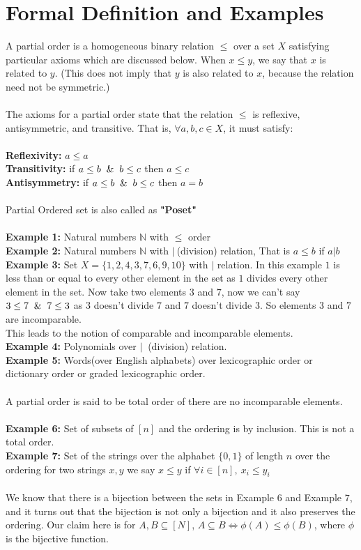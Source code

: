 \section{Formal Definition and Examples}
A partial order is a homogeneous binary relation $\leq$ over a set $X$ satisfying particular axioms which are discussed below. When $x\leq y$, we say that $x$ is related to $y$. (This does not imply that $y$ is also related to $x$, because the relation need not be symmetric.)\\\\
The axioms for a partial order state that the relation $\leq$ is reflexive, antisymmetric, and transitive. That is, $\forall a, b, c \in X$, it must satisfy:\\\\
\textbf{Reflexivity:} $a\leq a$\\
\textbf{Transitivity:} if $a\leq b \And b \leq c$ then $a \leq c$\\
\textbf{Antisymmetry:} if $a \leq b \And b \leq c$ then $a = b$\\\\
Partial Ordered set is also called as \textbf{"Poset"}\\\\
\textbf{Example 1:} Natural numbers $\mathbb{N}$ with $\leq$ order\\
\textbf{Example 2:} Natural numbers $\mathbb{N}$ with $|~$(division) relation, That is $a\leq b$ if $a | b$\\
\textbf{Example 3:} Set $X = \{1,2,4,3,7,6,9,10\}$ with $|$ relation. In this example $1$ is less than or equal to every other element in the set as $1$ divides every other element in the set. Now take two elements $3$ and $7$, now we can't say $3 \leq 7 \And 7 \leq 3$ as $3$ doesn't divide $7$ and $7$ doesn't divide $3$. So elements $3$ and $7$ are incomparable.\\
This leads to the notion of comparable and incomparable elements.\\
\textbf{Example 4:} Polynomials over $|~$ (division) relation.\\
\textbf{Example 5:} Words(over English alphabets) over lexicographic order or dictionary order or graded lexicographic order.\\\\
A partial order is said to be total order of there are no incomparable elements.\\\\
\textbf{Example 6:} Set of subsets of $[n]$ and the ordering is by inclusion. This is not a total order.\\
\textbf{Example 7:} Set of the strings over the alphabet $\{0,1\}$ of length $n$ over the ordering for two strings $x,y$ we say $x\leq y$ if $\forall i \in [n],~x_i \leq y_i$\\\\
We know that there is a bijection between the sets in Example $6$ and Example $7$, and it turns out that the bijection is not only a bijection and it also preserves the ordering. Our claim here is 
for $A,B \subseteq [N]$, $A \subseteq B \iff \phi(A) \leq \phi(B)$, where $\phi$ is the bijective function.

